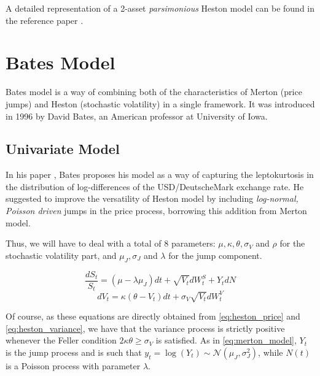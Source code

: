 A detailed representation of a 2-asset \textit{parsimonious} Heston model can be found in the reference paper \cite{PARSIMONIOUS2011}.

\section{Bates Model}
Bates model is a way of combining both of the characteristics of Merton (price jumps) and Heston (stochastic volatility) in a single framework.  It was introduced in 1996 by David Bates, an American professor at University of Iowa.

\subsection{Univariate Model}
In his paper \cite{BATES96}, Bates proposes his model as a way of capturing the leptokurtosis in the distribution of log-differences of the USD/DeutscheMark exchange rate. He suggested to improve the versatility of Heston model by including \textit{log-normal, Poisson driven} jumps in the price process, borrowing this addition from Merton model.

Thus, we will have to deal with a total of 8 parameters: $\mu, \kappa, \theta, \sigma_V$ and $ \rho$ for the stochastic volatility part, and $ \mu_J, \sigma_J$ and $ \lambda$ for the jump component. 


\begin{equation}
\frac{dS_t}{S_t} = (\mu - \lambda \mu_J) dt +\sqrt{ V_t} dW_t^S + Y_t dN 
\end{equation}
\begin{equation}
dV_t = \kappa (\theta - V_t) dt + \sigma_V \sqrt{V_t} dW_t^V
\end{equation}

Of course, as these equations are directly obtained from \eqref{eq:heston_price} and \eqref{eq:heston_variance}, we have that the variance process is strictly positive whenever the Feller condition $2\kappa\theta\geq \sigma_V$ is satisfied. As in \eqref{eq:merton_model}, $Y_t$ is  the jump process and is such that $ y_t = \log(Y_t) \sim \mathcal{N}(\mu_J, \sigma_J^2)$, while $N(t)$ is a Poisson process with parameter $\lambda$.


